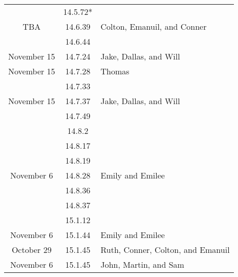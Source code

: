 \documentclass[12pt]{amsart}
\begin{document}
\begin{longtable}{c|c|l}
                        & 14.5.72*                             &                                          \\
        TBA             & 14.6.39                              & Colton, Emanuil, and Conner              \\
                        & 14.6.44                              &                                          \\
        November 15     & 14.7.24                              & Jake, Dallas, and Will                   \\
        November 15     & 14.7.28                              & Thomas                                   \\
                        & 14.7.33                              &                                          \\
        November 15     & 14.7.37                              & Jake, Dallas, and Will                   \\
                        & 14.7.49                              &                                          \\
                        & 14.8.2                               &                                          \\
                        & 14.8.17                              &                                          \\
                        & 14.8.19                              &                                          \\
        November 6      & 14.8.28                              & Emily and Emilee                         \\
                        & 14.8.36                              &                                          \\
                        & 14.8.37                              &                                          \\
                        & 15.1.12                              &                                          \\
        November 6      & 15.1.44                              & Emily and Emilee                         \\
        October 29      & 15.1.45                              & Ruth, Conner, Colton, and Emanuil        \\
        November 6      & 15.1.45                              & John, Martin, and Sam                    \\

\end{longtable}
\end{document}
